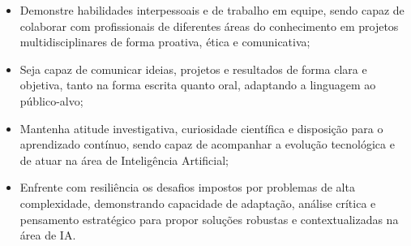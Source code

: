 \begin{itemize}
    \item Demonstre habilidades interpessoais e de trabalho em equipe, sendo capaz de colaborar com profissionais de diferentes áreas do conhecimento em projetos multidisciplinares de forma proativa, ética e comunicativa;
    
    \item Seja capaz de comunicar ideias, projetos e resultados de forma clara e objetiva, tanto na forma escrita quanto oral, adaptando a linguagem ao público-alvo;
    
    \item Mantenha atitude investigativa, curiosidade científica e disposição para o aprendizado contínuo, sendo capaz de acompanhar a evolução tecnológica e de atuar na área de Inteligência Artificial;
    
    \item Enfrente com resiliência os desafios impostos por problemas de alta complexidade, demonstrando capacidade de adaptação, análise crítica e pensamento estratégico para propor soluções robustas e contextualizadas na área de IA.

\end{itemize}

